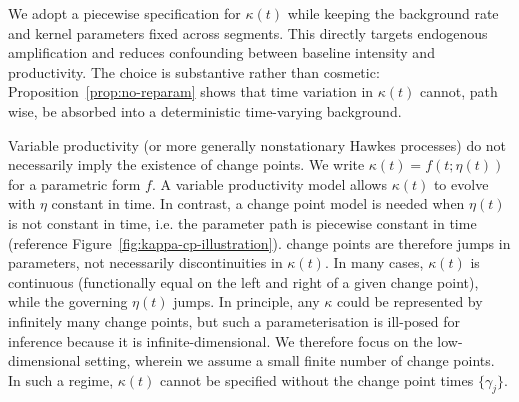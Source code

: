 \documentclass{article}
\theoremstyle{plain}
\theoremstyle{definition}
\newcommand{\1}{\mathbf{1}}
\begin{document}
    
    
    We adopt a piecewise specification for $\kappa(t)$ while keeping the background rate and kernel parameters fixed across segments. This directly targets endogenous amplification and reduces confounding between baseline intensity and productivity. The choice is substantive rather than cosmetic: Proposition~\ref{prop:no-reparam} shows that time variation in $\kappa(t)$ cannot, path wise, be absorbed into a deterministic time-varying background.
    
    Variable productivity (or more generally nonstationary Hawkes processes) do not necessarily imply the existence of change points. We write $\kappa(t)=f(t;\eta(t))$ for a parametric form $f$. A variable productivity model allows $\kappa(t)$ to evolve with $\eta$ constant in time. In contrast, a change point model is needed when $\eta(t)$ is not constant in time, i.e. the parameter path is piecewise constant in time (reference Figure~\ref{fig:kappa-cp-illustration}). change points are therefore jumps in parameters, not necessarily discontinuities in $\kappa(t)$. In many cases,  $\kappa(t)$ is continuous (functionally equal on the left and right of a given change point), while the governing $\eta(t)$ jumps. In principle, any $\kappa$ could be represented by infinitely many change points, but such a parameterisation is ill-posed for inference because it is infinite-dimensional. We therefore focus on the low-dimensional setting, wherein we assume a small finite number of change points. In such a regime, $\kappa(t)$ cannot be specified without the change point times $\{\gamma_j\}$. 
\end{document}
